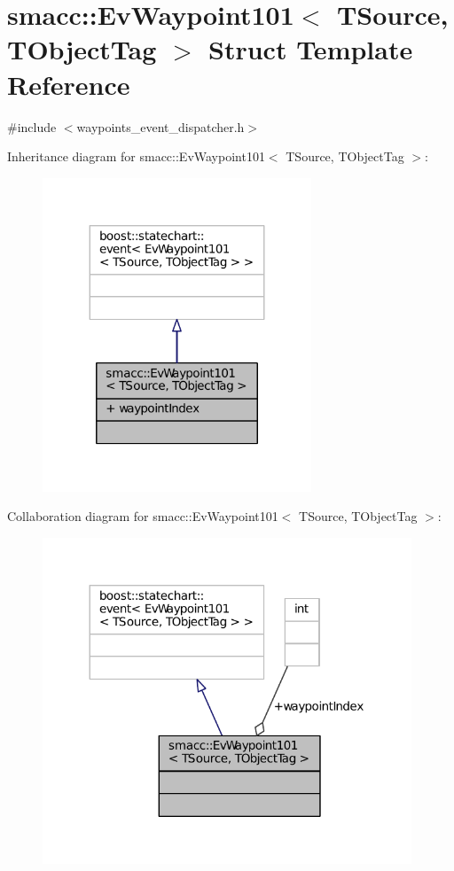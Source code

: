 \hypertarget{structsmacc_1_1EvWaypoint101}{}\section{smacc\+:\+:Ev\+Waypoint101$<$ T\+Source, T\+Object\+Tag $>$ Struct Template Reference}
\label{structsmacc_1_1EvWaypoint101}


{\ttfamily \#include $<$waypoints\+\_\+event\+\_\+dispatcher.\+h$>$}



Inheritance diagram for smacc\+:\+:Ev\+Waypoint101$<$ T\+Source, T\+Object\+Tag $>$\+:
\nopagebreak
\begin{figure}[H]
\begin{center}
\leavevmode
\includegraphics[width=227pt]{structsmacc_1_1EvWaypoint101__inherit__graph}
\end{center}
\end{figure}


Collaboration diagram for smacc\+:\+:Ev\+Waypoint101$<$ T\+Source, T\+Object\+Tag $>$\+:
\nopagebreak
\begin{figure}[H]
\begin{center}
\leavevmode
\includegraphics[width=312pt]{structsmacc_1_1EvWaypoint101__coll__graph}
\end{center}
\end{figure}
